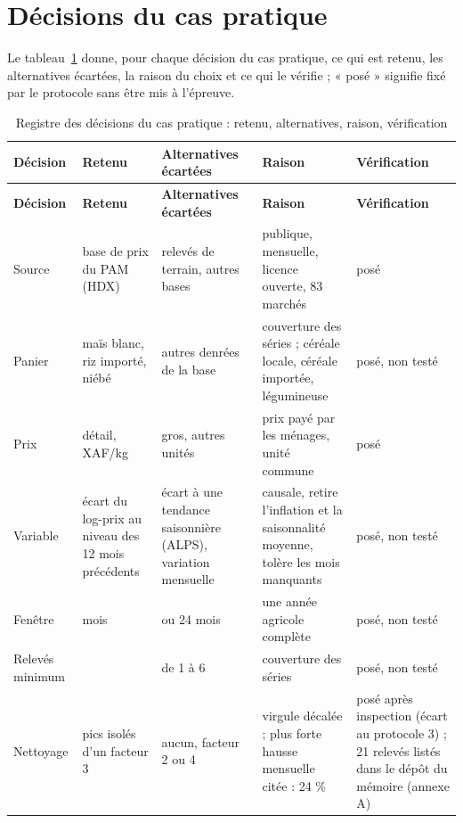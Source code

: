 \section{Décisions du cas pratique}
Le tableau~\ref{tab:registre_decisions_prix} donne, pour chaque décision du cas pratique, ce qui est retenu, les alternatives écartées, la raison du choix et ce qui le vérifie ; « posé » signifie fixé par le protocole sans être mis à l'épreuve.

{\scriptsize
\setlength{\tabcolsep}{3pt}
\begin{longtable}{>{\raggedright\arraybackslash}p{1.9cm}>{\raggedright\arraybackslash}p{2.9cm}>{\raggedright\arraybackslash}p{2.9cm}>{\raggedright\arraybackslash}p{3.9cm}>{\raggedright\arraybackslash}p{3.0cm}}
\caption{Registre des décisions du cas pratique : retenu, alternatives, raison, vérification}\label{tab:registre_decisions_prix}\\
\toprule
\textbf{Décision} & \textbf{Retenu} & \textbf{Alternatives écartées} & \textbf{Raison} & \textbf{Vérification} \\
\midrule
\endfirsthead
\toprule
\textbf{Décision} & \textbf{Retenu} & \textbf{Alternatives écartées} & \textbf{Raison} & \textbf{Vérification} \\
\midrule
\endhead
\bottomrule
\endfoot
Source & base de prix du PAM (HDX) & relevés de terrain, autres bases & publique, mensuelle, licence ouverte, 83 marchés & posé \\
Panier & maïs blanc, riz importé, niébé & autres denrées de la base & couverture des séries ; céréale locale, céréale importée, légumineuse & posé, non testé \\
Prix & détail, XAF/kg & gros, autres unités & prix payé par les ménages, unité commune & posé \\
Variable & écart du log-prix au niveau des 12 mois précédents & écart à une tendance saisonnière (ALPS), variation mensuelle & causale, retire l'inflation et la saisonnalité moyenne, tolère les mois manquants & posé, non testé \\
Fenêtre & 12 mois & 6 ou 24 mois & une année agricole complète & posé, non testé \\
Relevés minimum & 3 & de 1 à 6 & couverture des séries & posé, non testé \\
Nettoyage & pics isolés d'un facteur 3 & aucun, facteur 2 ou 4 & virgule décalée ; plus forte hausse mensuelle citée : 24 \% & posé après inspection (écart au protocole 3) ; 21 relevés listés dans le dépôt du mémoire (annexe A) \\

\end{longtable}}
